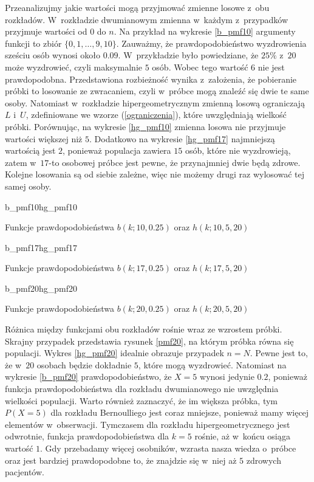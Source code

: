 Przeanalizujmy jakie wartości mogą przyjmować zmienne losowe z~obu rozkładów. W~rozkładzie dwumianowym zmienna w~każdym z~przypadków przyjmuje wartości od $0$ do $n$. Na przykład na wykresie \ref{b_pmf10} argumenty funkcji to zbiór $\{0,1,\ldots,9,10\}$. Zauważmy, że prawdopodobieństwo wyzdrowienia sześciu osób wynosi około $0.09$. W~przykładzie było powiedziane, że $25\%$ z~$20$ może wyzdrowieć, czyli maksymalnie $5$ osób. Wobec tego wartość $6$ nie jest prawdopodobna. Przedstawiona rozbieżność wynika z~założenia, że pobieranie próbki to losowanie ze zwracaniem, czyli w~próbce mogą znaleźć się dwie te same osoby. Natomiast w~rozkładzie hipergeometrycznym zmienną losową ograniczają $L$ i~$U$, zdefiniowane we wzorze (\ref{ograniczenia}), które uwzględniają wielkość próbki. Porównując, na wykresie \ref{hg_pmf10} zmienna losowa nie przyjmuje wartości większej niż $5$. Dodatkowo na wykresie \ref{hg_pmf17} najmniejszą wartością jest $2$, ponieważ populacja zawiera $15$ osób, które nie wyzdrowieją, zatem w~$17$-to osobowej próbce jest pewne, że przynajmniej dwie będą zdrowe. Kolejne losowania są od siebie zależne, więc nie możemy drugi raz wylosować tej samej osoby.

\begin{diagrams}{b_pmf10}{hg_pmf10}
	\caption{Funkcje prawdopodobieństwa $b(k;10,0.25)$ oraz $h(k;10,5,20)$}
	\label{pmf10}
\end{diagrams}

\begin{diagrams}{b_pmf17}{hg_pmf17}
	\caption{Funkcje prawdopodobieństwa $b(k;17,0.25)$ oraz $h(k;17,5,20)$}
	\label{pmf17}
\end{diagrams}

\begin{diagrams}{b_pmf20}{hg_pmf20}
	\caption{Funkcje prawdopodobieństwa $b(k;20,0.25)$ oraz $h(k;20,5,20)$}
	\label{pmf20}
\end{diagrams}

Różnica między funkcjami obu rozkładów rośnie wraz ze wzrostem próbki. Skrajny przypadek przedstawia rysunek \ref{pmf20}, na którym próbka równa się populacji. Wykres \ref{hg_pmf20} idealnie obrazuje przypadek $n=N$. Pewne jest to, że w~$20$ osobach będzie dokładnie $5$, które mogą wyzdrowieć. Natomiast na wykresie \ref{b_pmf20} prawdopodobieństwo, że $X=5$ wynosi jedynie $0.2$, ponieważ funkcja prawdopodobieństwa dla rozkładu dwumianowego nie uwzględnia wielkości populacji. Warto również zaznaczyć, że im większa próbka, tym $P(X=5)$ dla rozkładu Bernoulliego jest coraz mniejsze, ponieważ mamy więcej elementów w~obserwacji. Tymczasem dla rozkładu hipergeometrycznego jest odwrotnie, funkcja prawdopodobieństwa dla $k=5$ rośnie, aż w~końcu osiąga wartość $1$. Gdy przebadamy więcej osobników, wzrasta nasza wiedza o~próbce oraz jest bardziej prawdopodobne to, że znajdzie się w~niej aż $5$ zdrowych pacjentów.


